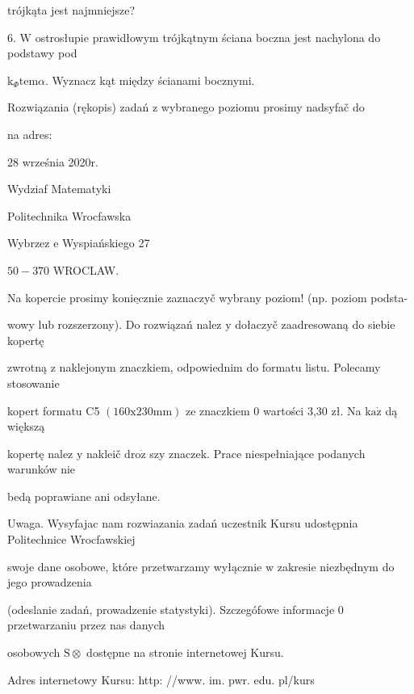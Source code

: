 \documentclass[a4paper,12pt]{article}
\begin{document}
trójkąta jest najmniejsze?

6. $\mathrm{W}$ ostrosłupie prawidłowym trójkątnym ściana boczna jest nachylona do podstawy pod

$\mathrm{k}_{\Phi}\mathrm{t}\mathrm{e}\mathrm{m}\alpha$. Wyznacz kąt między ścianami bocznymi.

Rozwiązania (rękopis) zadań z wybranego poziomu prosimy nadsyfač do

na adres:

28 września 2020r.

Wydziaf Matematyki

Politechnika Wrocfawska

Wybrzez $\mathrm{e}$ Wyspiańskiego 27

$50-370$ WROCLAW.

Na kopercie prosimy $\underline{\mathrm{k}\mathrm{o}\mathrm{n}\mathrm{i}\mathrm{e}\mathrm{c}\mathrm{z}\mathrm{n}\mathrm{i}\mathrm{e}}$ zaznaczyč wybrany poziom! (np. poziom podsta-

wowy lub rozszerzony). Do rozwiązań nalez $\mathrm{y}$ dołaczyč zaadresowaną do siebie kopertę

zwrotną $\mathrm{z}$ naklejonym znaczkiem, odpowiednim do formatu listu. Polecamy stosowanie

kopert formatu C5 $(160\mathrm{x}230\mathrm{m}\mathrm{m})$ ze znaczkiem $0$ wartości 3,30 zł. Na $\mathrm{k}\mathrm{a}\dot{\mathrm{z}}$ dą większą

kopertę nalez $\mathrm{y}$ nakleič $\mathrm{d}\mathrm{r}\mathrm{o}\dot{\mathrm{z}}$ szy znaczek. Prace niespełniające podanych warunków nie

bedą poprawiane ani odsyłane.

Uwaga. Wysyfajac nam rozwiazania zadań uczestnik Kursu udostępnia Politechnice Wrocfawskiej

swoje dane osobowe, które przetwarzamy wyłącznie $\mathrm{w}$ zakresie niezbędnym do jego prowadzenia

(odeslanie zadań, prowadzenie statystyki). Szczegófowe informacje $0$ przetwarzaniu przez nas danych

osobowych $\mathrm{S}\otimes$ dostępne na stronie internetowej Kursu.

Adres internetowy Kursu: http: //www. im. pwr. edu. pl/kurs
\end{document}
